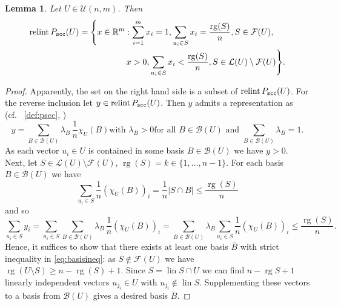 \documentclass[11pt, a4paper, twoside, reqno]{amsart}
\DeclareMathOperator*{\pos}{pos}
\DeclareMathOperator*{\lin}{lin}
\DeclareMathOperator*{\rg}{rg}
\newcommand{\R}{\mathbb{R}}
\newtheorem{lemma}[theorem]{Lemma}
\theoremstyle{definition}
\theoremstyle{remark}
\newcommand{\scc}{{\tt scc}}
\newcommand{\ov}{\overline}
\DeclareMathOperator{\relint}{relint}
\numberwithin{equation}{section}
\begin{document}
\begin{lemma} Let $U\in\mathcal{U}(n,m)$. Then
  \begin{equation*}
    \begin{split}
\relint P_\scc(U) =   \Biggl\{ x \in \R^m & : \sum_{i = 1}^m x_i = 1, \sum_{u_i \in S }  x_i = \frac{\rg(S)}{n},  S \in \mathcal{F}(U), \\
     &\, x > 0, \sum_{u_i \in  S }  x_i < \frac{\rg(S)}{n},  S \in
     \mathcal{L}(U) \setminus \mathcal{F}(U) \Biggl\}.
 \end{split}
\end{equation*}
\label{lem:relintscc}
\end{lemma}
\begin{proof} Apparently, the set on the right hand side is a subset
  of $\relint P_{\scc}(U)$. For the reverse inclusion let
  $y\in\relint P_\scc(U)$. Then $y$  admits a representation
  as (cf.~ \eqref{def:pscc},  \cite[Lemam 1.1.12]{Schneider2014})
  \begin{equation*}
    y=\sum_{B\in \mathcal{B}(U)} \lambda_B\,\frac{1}{n}\chi_U(B) \text{
      with }\lambda_B>0 \text{
      for all }  B\in \mathcal{B}(U)  \text{ and } \sum_{B\in \mathcal{B}(U)}\lambda_B=1.
  \end{equation*}
As each vector $u_i\in U$ is contained in some basis $B\in\mathcal{B}(U)$
we have $y>0$. Next, let $S \in
    \mathcal{L}(U) \setminus \mathcal{F}(U)$,
    $\rg(S)=k\in\{1,\dots,n-1\}$.   For each basis $B\in
    \mathcal{B}(U)$ we have
\begin{equation}
    \sum_{u_i\in S}\frac{1}{n}(\chi_U(B))_i =\frac{1}{n}|S\cap B|\leq
    \frac{\rg(S)}{n}
\label{eq:basisineq}
\end{equation}
    and so
    \begin{equation*}
       \sum_{u_i\in S}y_i = \sum_{u_i\in S} \sum_{B\in \mathcal{B}(U)}
       \lambda_B\,\frac{1}{n}(\chi_U(B))_i=  \sum_{B\in
         \mathcal{B}(U)}\lambda_B \sum_{u_i\in S}
       \frac{1}{n}(\chi_U(B))_i \leq \frac{\rg(S)}{n}.
    \end{equation*}
Hence, it suffices to show that there exists at least one basis $\ov
B$ with strict inequality in \eqref{eq:basisineq}: as $S\notin
\mathcal{F}(U)$ we have $\rg(U\setminus S) \geq n-\rg(S)+1$. Since
$S=\lin S\cap U$ 
we can find $n-\rg S +1$ linearly independent vectors $u_{j_i}\in U$
with $u_{j_i}\notin \lin S$. Supplementing these vectors to a basis
from $\mathcal{B}(U)$ gives a desired basis $\ov B$.
\end{proof}
\end{document}
